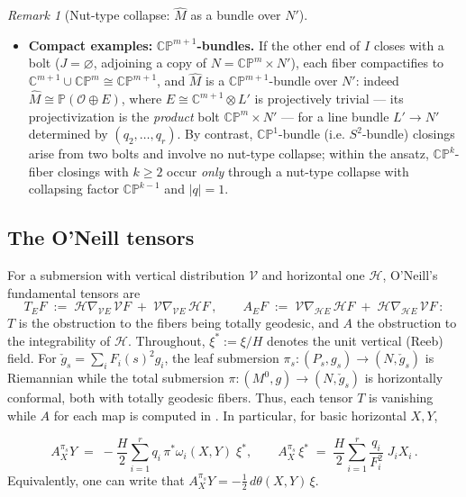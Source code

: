 \documentclass[11pt]{amsart}
\theoremstyle{plain}
\numberwithin{equation}{section}
\theoremstyle{definition}
\theoremstyle{remark}
\newtheorem*{remarkx}{Remark}
\begin{document}
\begin{remarkx}[Nut-type collapse: $\widehat{M}$ as a bundle over $N'$]
\begin{itemize}
		\item \textbf{Compact examples: }$\mathbb{CP}^{m+1}$\textbf{-bundles.} If the other end of $I$ closes with a bolt ($J = \varnothing$, adjoining a copy of $N = \mathbb{CP}^m \times N'$), each fiber compactifies to $\mathbb{C}^{m+1} \cup \mathbb{CP}^m \cong \mathbb{CP}^{m+1}$, and $\widehat{M}$ is a $\mathbb{CP}^{m+1}$-bundle over $N'$: indeed $\widehat{M} \cong \mathbb{P}(\mathcal{O} \oplus E)$, where $E \cong \mathbb{C}^{m+1} \otimes L'$ is projectively trivial --- its projectivization is the \emph{product} bolt $\mathbb{CP}^m \times N'$ --- for a line bundle $L' \to N'$ determined by $(q_2, \dots, q_r)$. By contrast, $\mathbb{CP}^1$-bundle (i.e. $S^2$-bundle) closings arise from two bolts and involve no nut-type collapse; within the ansatz, $\mathbb{CP}^k$-fiber closings with $k \geq 2$ occur \emph{only} through a nut-type collapse with collapsing factor $\mathbb{CP}^{k-1}$ and $|q| = 1$.
	\end{itemize}
	
\end{remarkx}
\fi

\subsection{The O'Neill tensors}\label{subsec:oneill}

For a submersion with vertical distribution $\mathcal{V}$ and horizontal one $\mathcal{H}$, O'Neill's fundamental tensors \cite{ONeill66} are
\[
T_E F \;:=\; \mathcal{H} \nabla_{\mathcal{V} E}\, \mathcal{V} F \;+\; \mathcal{V} \nabla_{\mathcal{V} E}\, \mathcal{H} F \,, \qquad
A_E F \;:=\; \mathcal{V} \nabla_{\mathcal{H} E}\, \mathcal{H} F \;+\; \mathcal{H} \nabla_{\mathcal{H} E}\, \mathcal{V} F \,:
\]
$T$ is the obstruction to the fibers being totally geodesic, and $A$ the obstruction to the integrability of $\mathcal{H}$. Throughout, $\xi^* := \xi / H$ denotes the unit vertical (Reeb) field.  For $\check{g}_s = \sum_i F_i ( s )^2 g_i$, the leaf submersion $\pi_s : ( P_s, g_s ) \to ( N, \check{g}_s )$ is Riemannian while the total submersion $\pi : ( M^0, g ) \to (N, \check{g}_s)$ is horizontally conformal, both with totally geodesic fibers. Thus, each tensor $T$ is vanishing while $A$ for each map is computed in \cite{FT}. In particular, for basic horizontal $X, Y$,

\begin{equation}\label{eq:A-leaf}
	A^{\pi_s}_X Y \;=\; -\frac{H}{2}\sum_{i=1}^r q_i\,\pi^*\omega_i(X,Y)\;\xi^*, \qquad A^{\pi_s}_X\, \xi^* \;=\; \frac{H}{2}\sum_{i=1}^r \frac{q_i}{F_i^2}\; J_i X_i \, .
\end{equation}
Equivalently, one can write that $A^{\pi_s}_X Y = -\tfrac{1}{2}\, d\theta(X,Y)\,\xi$. \\ %
\end{document}
